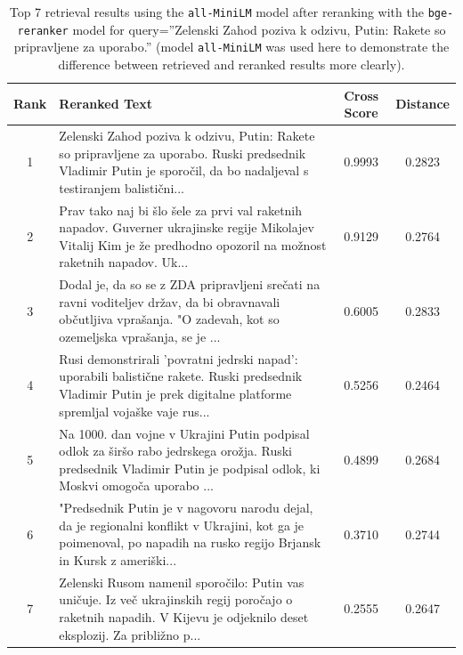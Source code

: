\documentclass[conference]{IEEEtran}
\begin{document}
\begin{table}
\centering
\small
\begin{tabular}{|c|p{13cm}|c|c|}
\hline
\textbf{Rank} & \textbf{Reranked Text} & \textbf{Cross Score} & \textbf{Distance} \\
\hline
1 & Zelenski Zahod poziva k odzivu, Putin: Rakete so pripravljene za uporabo. Ruski predsednik Vladimir Putin je sporočil, da bo nadaljeval s testiranjem balistični... & 0.9993 & 0.2823 \\
\hline
2 & Prav tako naj bi šlo šele za prvi val raketnih napadov. Guverner ukrajinske regije Mikolajev Vitalij Kim je že predhodno opozoril na možnost raketnih napadov. Uk... & 0.9129 & 0.2764 \\
\hline
3 & Dodal je, da so se z ZDA pripravljeni srečati na ravni voditeljev držav, da bi obravnavali občutljiva vprašanja. "O zadevah, kot so ozemeljska vprašanja, se je ... & 0.6005 & 0.2833 \\
\hline
4 & Rusi demonstrirali 'povratni jedrski napad': uporabili balistične rakete. Ruski predsednik Vladimir Putin je prek digitalne platforme spremljal vojaške vaje rus... & 0.5256 & 0.2464 \\
\hline
5 & Na 1000. dan vojne v Ukrajini Putin podpisal odlok za širšo rabo jedrskega orožja. Ruski predsednik Vladimir Putin je podpisal odlok, ki Moskvi omogoča uporabo ... & 0.4899 & 0.2684 \\
\hline
6 & "Predsednik Putin je v nagovoru narodu dejal, da je regionalni konflikt v Ukrajini, kot ga je poimenoval, po napadih na rusko regijo Brjansk in Kursk z ameriški... & 0.3710 & 0.2744 \\
\hline
7 & Zelenski Rusom namenil sporočilo: Putin vas uničuje. Iz več ukrajinskih regij poročajo o raketnih napadih. V Kijevu je odjeknilo deset eksplozij. Za približno p... & 0.2555 & 0.2647 \\
\hline
\end{tabular}
\caption{Top 7 retrieval results using the \texttt{all-MiniLM} model after reranking with the \texttt{bge-reranker} model for query=''Zelenski Zahod poziva k odzivu, Putin: Rakete so pripravljene za uporabo.'' (model \texttt{all-MiniLM} was used here to demonstrate the difference between retrieved and reranked results more clearly).}
\label{tab:long_query_reranked}
\end{table}
\end{document}
